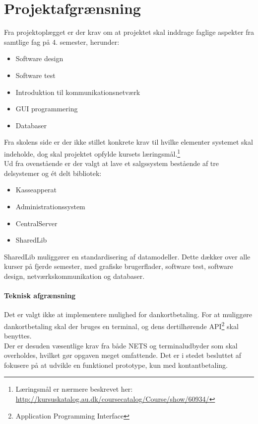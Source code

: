 \chapter{Projektafgrænsning}
Fra projektoplægget er der krav om at projektet skal inddrage faglige aspekter fra samtlige fag på 4. semester, herunder:

	\begin{itemize}
		\item Software design
		\item Software test
		\item Introduktion til kommunikationsnetværk
		\item GUI programmering
		\item Databaser
	\end{itemize}

Fra skolens side er der ikke stillet konkrete krav til hvilke elementer systemet skal indeholde, dog skal projektet opfylde kursets læringsmål.\footnote{Læringsmål er nærmere beskrevet her: \url{http://kursuskatalog.au.dk/coursecatalog/Course/show/60934/}}\\
Ud fra ovenstående er der valgt at lave et salgssystem bestående af tre delsystemer og ét delt bibliotek:
\begin{itemize}
	\item Kasseapperat
	\item Administrationssystem
	\item CentralServer
	\item SharedLib
\end{itemize}

SharedLib muliggører en standardisering af datamodeller. Dette dækker over alle kurser på fjerde semester, med grafiske brugerflader, software test, software design, netværkskommunikation og databaser.

\subsubsection{Teknisk afgrænsning}
Det er valgt ikke at implementere mulighed for dankortbetaling. For at muliggøre dankortbetaling skal der bruges en terminal, og dens dertilhørende API\footnote{Application Programming Interface} skal benyttes.\\
Der er desuden væsentlige krav fra både NETS og terminaludbyder som skal overholdes, hvilket gør opgaven meget omfattende. Det er i stedet besluttet af fokusere på at udvikle en funktionel prototype, kun med kontantbetaling.


